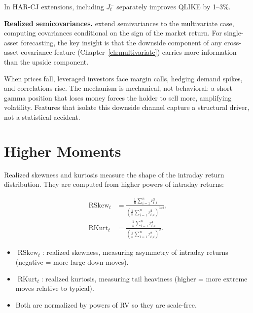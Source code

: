 \begin{projectconnection}
In HAR-CJ extensions, including $J_t^-$ separately improves QLIKE by 1--3\%.
\end{projectconnection}

\textbf{Realized semicovariances.}
\citet{BollerslevLiPattonQuaedvlieg2020} extend semivariances to the multivariate case, computing covariances conditional on the sign of the market return.
For single-asset forecasting, the key insight is that the downside component of any cross-asset covariance feature (Chapter~\ref{ch:multivariate}) carries more information than the upside component.

\begin{intuition}
When prices fall, leveraged investors face margin calls, hedging demand spikes, and correlations rise.
The mechanism is mechanical, not behavioral: a short gamma position that loses money forces the holder to sell more, amplifying volatility.
Features that isolate this downside channel capture a structural driver, not a statistical accident.
\end{intuition}

\section{Higher Moments}\label{sec:feat-moments}

Realized skewness and kurtosis measure the shape of the intraday return distribution. They are computed from higher powers of intraday returns:

\begin{align}
\operatorname{RSkew}_t &= \frac{\frac{1}{n}\sum_{i=1}^{n} r_{t,i}^3}{\left(\frac{1}{n}\sum_{i=1}^{n} r_{t,i}^2\right)^{3/2}}, \label{eq:rskew}\\[6pt]
\operatorname{RKurt}_t &= \frac{\frac{1}{n}\sum_{i=1}^{n} r_{t,i}^4}{\left(\frac{1}{n}\sum_{i=1}^{n} r_{t,i}^2\right)^{2}}. \label{eq:rkurt}
\end{align}
\begin{itemize}[nosep]
  \item $\operatorname{RSkew}_t$: realized skewness, measuring asymmetry of intraday returns (negative = more large down-moves).
  \item $\operatorname{RKurt}_t$: realized kurtosis, measuring tail heaviness (higher = more extreme moves relative to typical).
  \item Both are normalized by powers of RV so they are scale-free.
\end{itemize}

